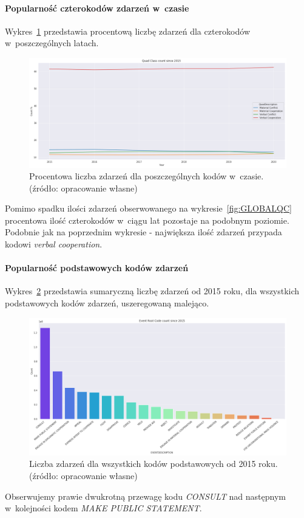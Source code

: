 \documentclass[11pt]{report}
\begin{document}
    \paragraph{Popularność czterokodów zdarzeń w~czasie}
    Wykres~\ref{fig:GLOBALQCperc} przedstawia procentową liczbę zdarzeń dla czterokodów w~poszczególnych latach.
    \begin{figure}[!htp]
        \centering
        \includegraphics[width=\linewidth]{fig/GLOBAL/QCperc.png}
        \caption{Procentowa liczba zdarzeń dla poszczególnych kodów w~czasie. (źródło: opracowanie własne)}
        \label{fig:GLOBALQCperc}
    \end{figure}
    Pomimo spadku ilości zdarzeń obserwowanego na wykresie~\ref{fig:GLOBALQC} procentowa ilość czterokodów w~ciągu lat pozostaje na podobnym poziomie.
    Podobnie jak na poprzednim wykresie - największa ilość zdarzeń przypada kodowi \textit{verbal cooperation}.

    \paragraph{Popularność podstawowych kodów zdarzeń}
    Wykres~\ref{fig:GLOBALERC} przedstawia sumaryczną liczbę zdarzeń od 2015 roku, dla wszystkich podstawowych kodów zdarzeń, uszeregowaną malejąco.
    \begin{figure}[!htp]
        \centering
        \includegraphics[width=\linewidth]{fig/GLOBAL/ERC.png}
        \caption{Liczba zdarzeń dla wszystkich kodów podstawowych od 2015 roku. (źródło: opracowanie własne)}
        \label{fig:GLOBALERC}
    \end{figure}
    Obserwujemy prawie dwukrotną przewagę kodu \textit{CONSULT} nad następnym w~kolejności kodem \textit{MAKE PUBLIC STATEMENT}.
\end{document}
